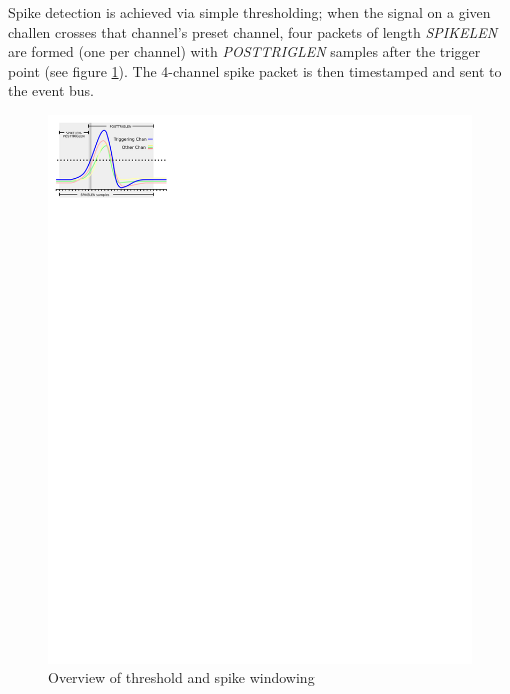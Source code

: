 Spike detection is achieved via simple thresholding; when the signal on a given challen crosses that channel's preset channel, four packets of length \textit{SPIKELEN} are formed (one per channel) with \textit{POSTTRIGLEN} samples after the trigger point (see figure \ref{threshold}). The 4-channel spike packet is then timestamped and sent to the event bus. 

\begin{figure}
\includegraphics[scale=2.0]{threshold.svg}
\caption{Overview of threshold and spike windowing}
\label{threshold}
\end{figure}

